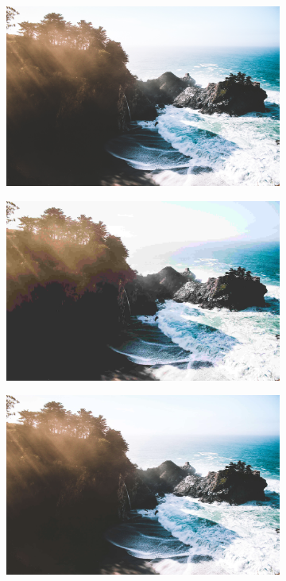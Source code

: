 \documentclass{article}
\begin{document}
\begin{figure}
    \centering
    \begin{subfigure}[b]{0.49 \textwidth}
    \includegraphics[width=\textwidth]{Images/test1.png}
    \end{subfigure}
    \begin{subfigure}[b]{0.49 \textwidth}
    \includegraphics[width=\textwidth]{Images/jpeg/reconstructed/test1_10.png}
    \end{subfigure}
    \begin{subfigure}[b]{0.49 \textwidth}
    \includegraphics[width=\textwidth]{Images/jpeg/reconstructed/test1_60.png}

\end{subfigure}
\end{figure}
\end{document}
